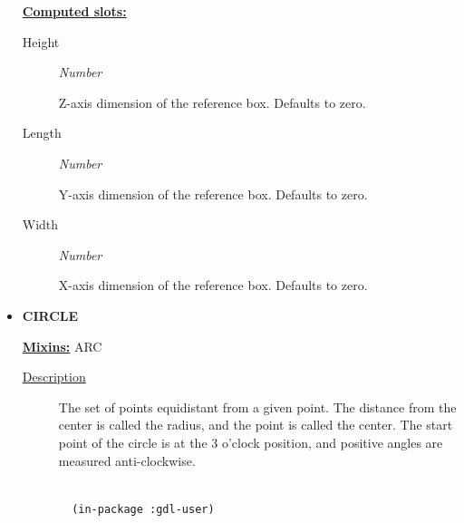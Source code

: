\documentclass [11pt]{book}
\begin{document}
\begin{itemize}
\textbf{
\underline{Computed slots:}}

\begin{description}

\item [Height]
\emph{Number}

 Z-axis dimension of the reference box. Defaults to zero.




\item [Length]
\emph{Number}

 Y-axis dimension of the reference box. Defaults to zero.




\item [Width]
\emph{Number}

 X-axis dimension of the reference box. Defaults to zero.




\end{description}







\item {}
\textbf{CIRCLE}


\textbf{
\underline{Mixins:}} ARC





\begin{description}

\item [
\underline{Description}]


The set of points equidistant from a given point. 
The distance from the center is called the radius, and the point is called 
the center. The start point of the circle is at the 3 o'clock position, and positive
angles are measured anti-clockwise.



\end{description}




\begin{figure}
\begin{lrbox}{\boxedverb}
\begin{minipage}{\linewidth}
{\small

\begin{verbatim}

  (in-package :gdl-user)
                  

\end{verbatim}}
\end{minipage}
\end{lrbox}
\end{figure}
\end{itemize}
\end{document}
